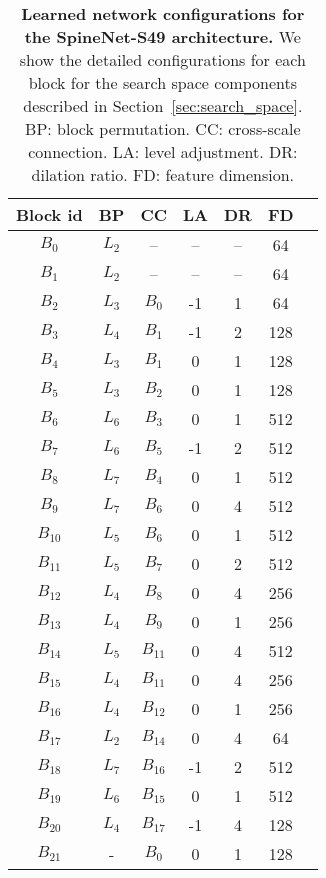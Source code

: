 \documentclass[10pt,twocolumn,letterpaper]{article}
\begin{document}
\setlength{\tabcolsep}{4pt}
\begin{table}[t!]
\centering
\begin{tabular}{c  |cccccc}
  \toprule
  Block id & BP & CC & LA & DR & FD \\
  \midrule
  $B_0$ & $L_2$ & -- &-- & -- & 64 \\ 
  $B_1$ & $L_2$ & -- & -- & -- & 64 \\
  \midrule
  $B_2$ & $L_3$ & $B_0$ & -1 & 1 & 64\\
  $B_3$ & $L_4$ & $B_1$ & -1 & 2 & 128\\
  $B_4$ & $L_3$ & $B_1$ & 0 & 1 & 128\\
  $B_5$ & $L_3$ & $B_2$ & 0 & 1 & 128\\
  $B_6$ & $L_6$ & $B_3$ & 0 & 1 & 512\\
  $B_7$ & $L_6$ & $B_5$ & -1 & 2 & 512\\
  $B_8$ & $L_7$ & $B_4$ & 0 & 1 & 512\\
  $B_9$ & $L_7$ & $B_6$ & 0 & 4 & 512\\
  $B_{10}$ & $L_5$ & $B_6$ & 0 & 1 & 512\\
  $B_{11}$ & $L_5$ & $B_7$ & 0 & 2 & 512\\
  $B_{12}$ & $L_4$ & $B_8$ & 0 & 4 & 256\\
  $B_{13}$ & $L_4$ & $B_9$ & 0 & 1 & 256\\
  $B_{14}$ & $L_5$ & $B_{11}$ & 0 & 4 & 512 \\
  $B_{15}$ & $L_4$ & $B_{11}$ & 0 & 4 & 256\\
  $B_{16}$ & $L_4$ & $B_{12}$ & 0 & 1 & 256\\
  $B_{17}$ & $L_2$ & $B_{14}$ & 0 & 4 & 64 \\
  $B_{18}$ & $L_7$ & $B_{16}$ & -1 & 2 & 512\\
  $B_{19}$ & $L_6$ & $B_{15}$ & 0 & 1 & 512\\
  $B_{20}$ & $L_4$ & $B_{17}$ & -1 & 4 & 128\\
  \midrule
  $B_{21}$ & - & $B_{0}$ & 0 & 1 & 128\\
  \bottomrule
\end{tabular}
\caption{\textbf{Learned network configurations for the SpineNet-S49 architecture.} We show the detailed configurations for each block for the search space components described in Section~\ref{sec:search_space}. BP: block permutation. CC: cross-scale connection. LA: level adjustment. DR: dilation ratio. FD: feature dimension.}
\label{tab:search_results} 
\end{table}
\end{document}
